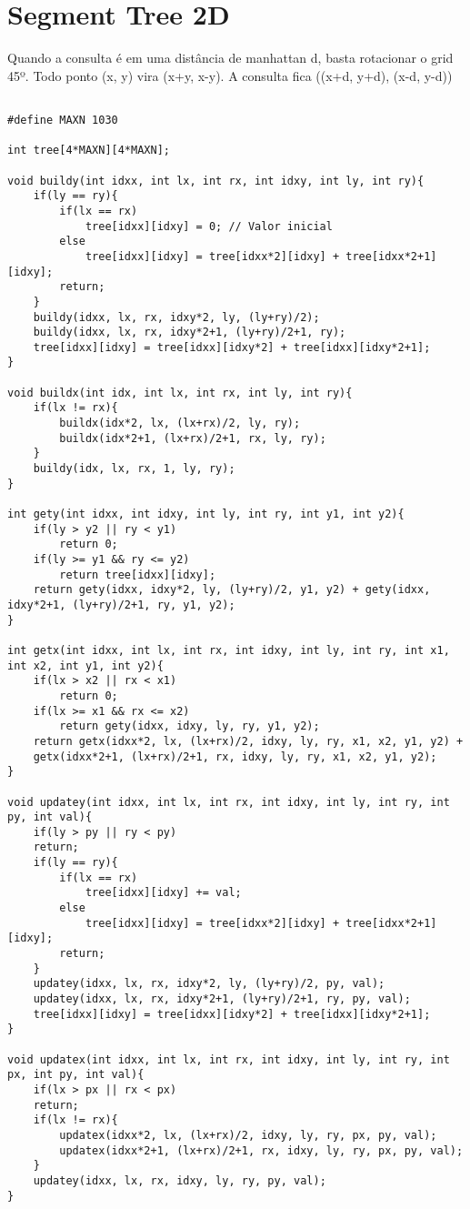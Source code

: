 \section{Segment Tree 2D}

Quando a consulta é em uma distância de manhattan d, basta rotacionar o grid 45º.
Todo ponto (x, y) vira (x+y, x-y).
A consulta fica ((x+d, y+d), (x-d, y-d))

\begin{multicols}{2}
	\begin{lstlisting}

#define MAXN 1030

int tree[4*MAXN][4*MAXN];

void buildy(int idxx, int lx, int rx, int idxy, int ly, int ry){
	if(ly == ry){
		if(lx == rx)
			tree[idxx][idxy] = 0; // Valor inicial
		else
			tree[idxx][idxy] = tree[idxx*2][idxy] + tree[idxx*2+1][idxy];
		return;
	}
	buildy(idxx, lx, rx, idxy*2, ly, (ly+ry)/2);
	buildy(idxx, lx, rx, idxy*2+1, (ly+ry)/2+1, ry);
	tree[idxx][idxy] = tree[idxx][idxy*2] + tree[idxx][idxy*2+1];
}

void buildx(int idx, int lx, int rx, int ly, int ry){
	if(lx != rx){
		buildx(idx*2, lx, (lx+rx)/2, ly, ry);
		buildx(idx*2+1, (lx+rx)/2+1, rx, ly, ry);
	}
	buildy(idx, lx, rx, 1, ly, ry);
}

int gety(int idxx, int idxy, int ly, int ry, int y1, int y2){
	if(ly > y2 || ry < y1)
		return 0;
	if(ly >= y1 && ry <= y2)
		return tree[idxx][idxy];
	return gety(idxx, idxy*2, ly, (ly+ry)/2, y1, y2) + gety(idxx, idxy*2+1, (ly+ry)/2+1, ry, y1, y2);
}

int getx(int idxx, int lx, int rx, int idxy, int ly, int ry, int x1, int x2, int y1, int y2){
	if(lx > x2 || rx < x1)
		return 0;
	if(lx >= x1 && rx <= x2)
		return gety(idxx, idxy, ly, ry, y1, y2);
	return getx(idxx*2, lx, (lx+rx)/2, idxy, ly, ry, x1, x2, y1, y2) +
	getx(idxx*2+1, (lx+rx)/2+1, rx, idxy, ly, ry, x1, x2, y1, y2);
}

void updatey(int idxx, int lx, int rx, int idxy, int ly, int ry, int py, int val){
	if(ly > py || ry < py)
	return;
	if(ly == ry){
		if(lx == rx)
			tree[idxx][idxy] += val;
		else
			tree[idxx][idxy] = tree[idxx*2][idxy] + tree[idxx*2+1][idxy];
		return;
	}
	updatey(idxx, lx, rx, idxy*2, ly, (ly+ry)/2, py, val);
	updatey(idxx, lx, rx, idxy*2+1, (ly+ry)/2+1, ry, py, val);
	tree[idxx][idxy] = tree[idxx][idxy*2] + tree[idxx][idxy*2+1];
}

void updatex(int idxx, int lx, int rx, int idxy, int ly, int ry, int px, int py, int val){
	if(lx > px || rx < px)
	return;
	if(lx != rx){
		updatex(idxx*2, lx, (lx+rx)/2, idxy, ly, ry, px, py, val);
		updatex(idxx*2+1, (lx+rx)/2+1, rx, idxy, ly, ry, px, py, val);
	}
	updatey(idxx, lx, rx, idxy, ly, ry, py, val);
}

	\end{lstlisting}
\end{multicols}
